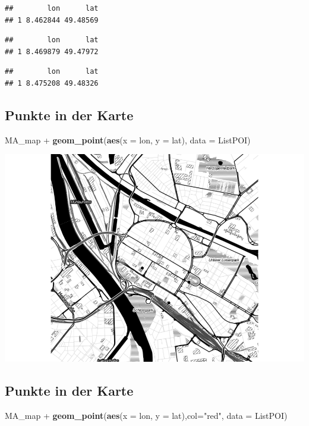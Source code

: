 \documentclass[]{article}
\newenvironment{Shaded}{\begin{snugshade}}{\end{snugshade}}
\newcommand{\KeywordTok}[1]{\textcolor[rgb]{0.13,0.29,0.53}{\textbf{{#1}}}}
\newcommand{\DataTypeTok}[1]{\textcolor[rgb]{0.13,0.29,0.53}{{#1}}}
\newcommand{\StringTok}[1]{\textcolor[rgb]{0.31,0.60,0.02}{{#1}}}
\newcommand{\NormalTok}[1]{{#1}}
\begin{document}
\begin{verbatim}
##        lon      lat
## 1 8.462844 49.48569
\end{verbatim}

\begin{verbatim}
##        lon      lat
## 1 8.469879 49.47972
\end{verbatim}

\begin{verbatim}
##        lon      lat
## 1 8.475208 49.48326
\end{verbatim}

\subsection{Punkte in der Karte}\label{punkte-in-der-karte}

\begin{Shaded}
\begin{Highlighting}[]
\NormalTok{MA_map +}
\KeywordTok{geom_point}\NormalTok{(}\KeywordTok{aes}\NormalTok{(}\DataTypeTok{x =} \NormalTok{lon, }\DataTypeTok{y =} \NormalTok{lat),}
\DataTypeTok{data =} \NormalTok{ListPOI)}
\end{Highlighting}
\end{Shaded}

\includegraphics{Intro_Datenanalyse1_files/figure-latex/unnamed-chunk-266-1.pdf}

\subsection{Punkte in der Karte}\label{punkte-in-der-karte-1}

\begin{Shaded}
\begin{Highlighting}[]
\NormalTok{MA_map +}
\KeywordTok{geom_point}\NormalTok{(}\KeywordTok{aes}\NormalTok{(}\DataTypeTok{x =} \NormalTok{lon, }\DataTypeTok{y =} \NormalTok{lat),}\DataTypeTok{col=}\StringTok{"red"}\NormalTok{,}
\DataTypeTok{data =} \NormalTok{ListPOI)}
\end{Highlighting}
\end{Shaded}
\end{document}
